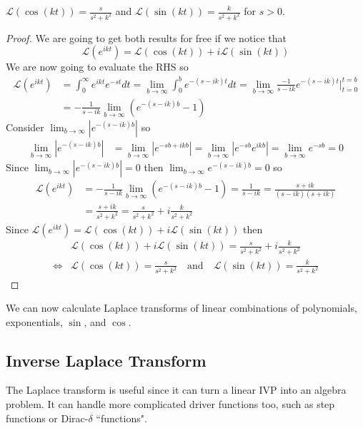 \documentclass[notes]{subfiles}
\begin{document}
\begin{theorem}
    $\mathcal{L}(\cos(kt)) = \frac{s}{s^2 + k^2}$ and $\mathcal{L}(\sin(kt)) = \frac{k}{s^2 + k^2}$ for $s > 0$.
\end{theorem}
\begin{proof}
    We are going to get both results for free if we notice that
    \[
        \mathcal{L}(e^{ikt}) = \mathcal{L}(\cos(kt)) + i\mathcal{L}(\sin(kt))
    \]
    We are now going to evaluate the RHS so
    \begin{align*}
        \mathcal{L}(e^{ikt})
        &= \int_0^\infty e^{ikt}e^{-st}dt
        = \lim_{b\to\infty} \int_0^b e^{-(s - ik)t}dt
        = \lim_{b\to\infty} \frac{-1}{s - ik}e^{-(s - ik)t} \Big|_{t = 0}^{t = b} \\
        &= -\frac{1}{s - ik} \lim_{b\to\infty} (e^{-(s - ik)b} - 1)
    \end{align*}
    Consider $\lim_{b\to\infty} |e^{-(s - ik)b}|$ so
    \begin{align*}
        \lim_{b\to\infty} |e^{-(s - ik)b}|
        &= \lim_{b\to\infty} |e^{-sb + ikb}|
        = \lim_{b\to\infty} |e^{-sb}e^{ikb}|
        = \lim_{b\to\infty} e^{-sb}
        = 0
    \end{align*}
    Since $\lim_{b\to\infty} |e^{-(s - ik)b}| = 0$ then $\lim_{b\to\infty} e^{-(s - ik)b} = 0$ so
    \begin{align*}
        \mathcal{L}(e^{ikt})
        &= -\frac{1}{s - ik} \lim_{b\to\infty} (e^{-(s - ik)b} - 1)
        = \frac{1}{s - ik}
        = \frac{s + ik}{(s - ik)(s + ik)} \\
        &= \frac{s + ik}{s^2 + k^2}
        = \frac{s}{s^2 + k^2} + i\frac{k}{s^2 + k^2}
    \end{align*}
    Since $\mathcal{L}(e^{ikt}) = \mathcal{L}(\cos(kt)) + i\mathcal{L}(\sin(kt))$ then
    \begin{align*}
        &\mathcal{L}(\cos(kt)) + i\mathcal{L}(\sin(kt)) = \frac{s}{s^2 + k^2} + i\frac{k}{s^2 + k^2} \\
        \iff& \mathcal{L}(\cos(kt)) = \frac{s}{s^2 + k^2} \quad \text{and} \quad \mathcal{L}(\sin(kt)) = \frac{k}{s^2 + k^2}
    \end{align*}
\end{proof}

We can now calculate Laplace transforms of linear combinations of polynomials, exponentials, $\sin$, and $\cos$.

\subsection{Inverse Laplace Transform}
The Laplace transform is useful since it can turn a linear IVP into an algebra problem. It can handle more complicated driver functions too, such as step functions or Dirac-$\delta$ ``functions".
\end{document}
